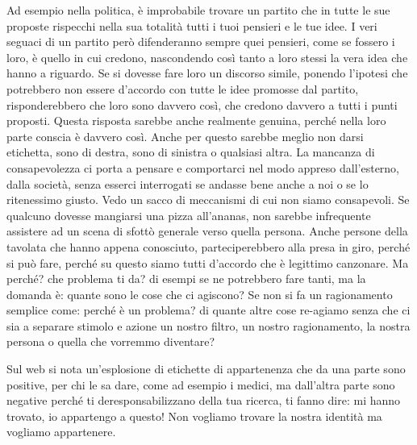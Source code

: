\documentclass[12pt]{book} %
\begin{document}
Ad esempio nella politica, è improbabile trovare un partito che in tutte le sue proposte rispecchi nella sua totalità
tutti i tuoi pensieri e le tue idee. I veri seguaci di un partito però difenderanno sempre quei pensieri, come se
fossero i loro, è quello in cui credono, nascondendo così tanto a loro stessi la vera idea che hanno a riguardo. Se si
dovesse fare loro un discorso simile, ponendo l'ipotesi che potrebbero non essere
d'accordo con tutte le idee promosse dal partito, risponderebbero che loro sono davvero così, che
credono davvero a tutti i punti proposti. Questa risposta sarebbe anche realmente genuina, perché nella loro parte
conscia è davvero così. Anche per questo sarebbe meglio non darsi etichetta, sono di destra, sono di sinistra o
qualsiasi altra. La mancanza di consapevolezza ci porta a pensare e comportarci nel modo appreso
dall'esterno, dalla società, senza esserci interrogati se andasse bene anche a noi o se lo
ritenessimo giusto.
Vedo un sacco di meccanismi di cui non siamo consapevoli. Se qualcuno dovesse mangiarsi una pizza all'ananas, non sarebbe infrequente assistere ad un scena di sfottò generale verso quella persona. Anche persone della tavolata che hanno appena conosciuto, parteciperebbero alla presa in giro, perché si può fare, perché su questo siamo tutti d'accordo che è legittimo canzonare. Ma perché? che problema ti da? di esempi se ne potrebbero fare tanti, ma la domanda è: quante sono le cose che ci agiscono? Se non si fa un ragionamento semplice come: perché è un problema? di quante altre cose re-agiamo senza che ci sia a separare stimolo e azione un nostro filtro, un nostro ragionamento, la nostra persona o quella che vorremmo diventare?

Sul web si nota un'esplosione di etichette di appartenenza che da una parte sono positive, per chi le sa dare, come ad esempio i medici, ma dall'altra parte sono negative perché ti deresponsabilizzano della tua ricerca, ti fanno dire: mi hanno trovato, io appartengo a questo!
Non vogliamo trovare la nostra identità ma vogliamo appartenere. 

\bigskip
\end{document}

